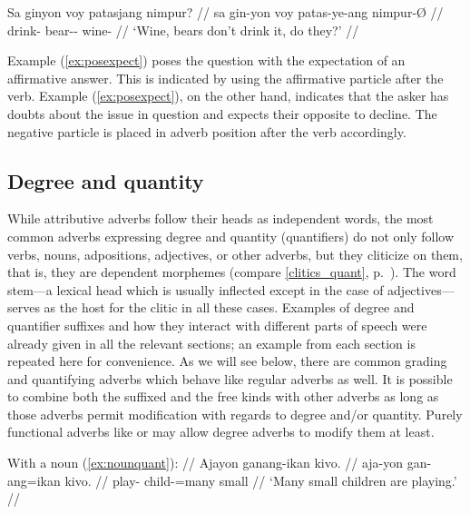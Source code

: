 \a\label{ex:negexpect}\begingl
	\gla Sa ginyon voy patasjang nimpur? //
	\glb sa gin-yon voy patas-ye-ang nimpur-Ø //
	\glc \PatT{} drink-\TplN{} \Neg{} bear-\Pl{}-\Aarg{} wine-\Top{} //
	\glft `Wine, bears don't drink it, do they?' //
\endgl
\xe

Example (\ref{ex:posexpect}) poses the question with the expectation of an 
affirmative answer. This is indicated by using the affirmative particle 
 after the verb. Example (\ref{ex:posexpect}), on the other 
hand, indicates that the asker has doubts about the issue in question and 
expects their opposite to decline. The negative particle  
is placed in adverb position after the verb accordingly.


\subsection{Degree and quantity}
\label{subsec:quantifiers}

While attributive adverbs follow their heads as independent words, the most
common adverbs expressing degree and quantity (quantifiers) do not only follow
verbs, nouns, adpositions, adjectives, or other adverbs, but they cliticize on
them, that is, they are dependent morphemes (compare \autoref{clitics_quant},
p.~\pageref{clitics_quant}). The word stem---a lexical head  which is usually
inflected except in the case of adjectives---serves as the  host for the
clitic in all these cases. Examples of degree and quantifier  suffixes and how
they interact with different parts of speech were already  given in all the
relevant sections; an example from each section is repeated  here for
convenience. As we will see below, there are common grading and  quantifying
adverbs which behave like regular adverbs as well. It is possible  to combine
both the suffixed and the free kinds with other adverbs as long as  those
adverbs permit modification with regards to degree and/or quantity.  Purely
functional adverbs like  or
 may allow degree adverbs to modify them at
least.

\pex
\a\label{ex:nounquant2}\begingl
	\glpreamble With a noun (\ref{ex:nounquant}): //
	\gla Ajayon ganang-ikan kivo. //
	\glb aja-yon gan-ang=ikan kivo. //
	\glc play-\TsgN{} child-\Aarg{}=many small //
	\glft `Many small children are playing.' //
\endgl

